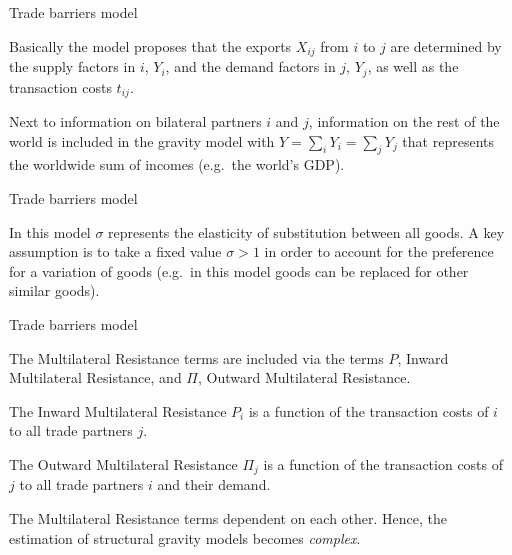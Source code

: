 \documentclass[ignorenonframetext,compress,aspectratio=169]{beamer}
\begin{document}
\begin{frame}{Trade barriers model}

Basically the model proposes that the exports \(X_{ij}\) from \(i\) to
\(j\) are determined by the supply factors in \(i\), \(Y_{i}\), and the
demand factors in \(j\), \(Y_{j}\), as well as the transaction costs
\(t_{ij}\).

Next to information on bilateral partners \(i\) and \(j\), information
on the rest of the world is included in the gravity model with
\(Y=\sum_{i} Y_{i}= \sum_{j} Y_{j}\) that represents the worldwide sum
of incomes (e.g.~the world's GDP).

\end{frame}

\begin{frame}{Trade barriers model}

In this model \(\sigma\) represents the elasticity of substitution
between all goods. A key assumption is to take a fixed value
\(\sigma > 1\) in order to account for the preference for a variation of
goods (e.g.~in this model goods can be replaced for other similar
goods).

\end{frame}

\begin{frame}{Trade barriers model}

The Multilateral Resistance terms are included via the terms \(P\),
Inward Multilateral Resistance, and \(\Pi\), Outward Multilateral
Resistance.

The Inward Multilateral Resistance \(P_i\) is a function of the
transaction costs of \(i\) to all trade partners \(j\).

The Outward Multilateral Resistance \(\Pi_{j}\) is a function of the
transaction costs of \(j\) to all trade partners \(i\) and their demand.

The Multilateral Resistance terms dependent on each other. Hence, the
estimation of structural gravity models becomes \emph{complex}.

\end{frame}
\end{document}
